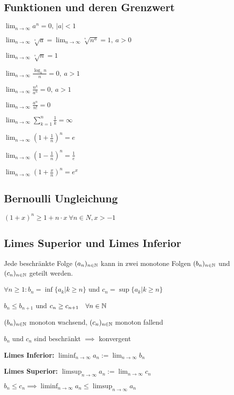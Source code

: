 \subsection{Funktionen und deren Grenzwert}
\begin{compactitem}
    \item $\lim_{n \to \infty} a^n = 0, \ |a| < 1$
    \item $\lim_{n \to \infty} \sqrt[^n]{a} = \lim_{n \to \infty} \sqrt[^n]{n^a} = 1, \ a > 0$
    \item $\lim_{n \to \infty} \sqrt[^n]{n} = 1$
    \item $\lim_{n \to \infty} \frac{\log_an}{n} = 0, \ a > 1$
    \item $\lim_{n \to \infty} \frac{n^k}{a^n} = 0, \ a > 1$
    \item $\lim_{n \to \infty} \frac{a^n}{n!} = 0$
    \item $\lim_{n \to \infty} \sum_{k=1}^{n} \frac{1}{k} = \infty$
    \item $\lim_{n \to \infty} \left( 1 + \frac{1}{n} \right)^n = e$
    \item $\lim_{n \to \infty} \left( 1 - \frac{1}{n} \right)^n = \frac{1}{e}$
    \item $\lim_{n \to \infty} \left( 1 + \frac{x}{n} \right)^n =e^x$
\end{compactitem}

\subsection{Bernoulli Ungleichung}
$\left( 1 + x \right)^{n} \ge  1 + n \cdot x \ \forall n \in N, x > -1 $

\subsection{Limes Superior und Limes Inferior}
Jede beschränkte Folge $(a_n)_{n \in \mathbb{N}}$ kann in zwei monotone Folgen $(b_n)_{n \in \mathbb{N}}$ und $(c_n)_{n \in \mathbb{N}}$ geteilt werden.
\begin{compactenum}
    \item $\forall n \ge 1: b_n = \inf \{a_k | k \ge n\}$ und $c_n = \sup \{a_k | k \ge n\} $
    \item $b_n \le b_{n+1}$ und $c_n \ge c_{n+1} \quad \forall n \in \mathbb{N}$
    \item $(b_n)_{n \in \mathbb{N}}$ monoton wachsend, $(c_n)_{n \in \mathbb{N}}$ monoton fallend
    \item $b_n$ und $c_n$ sind beschränkt $\implies$ konvergent
    \item \textbf{Limes Inferior:} $\liminf_{n \to \infty} a_n := \lim_{n \to \infty} b_n $
    \item \textbf{Limes Superior:} $\limsup_{n \to \infty} a_n := \lim_{n \to \infty} c_n $
    \item $b_n \le  c_n \implies \liminf_{n \to \infty} a_n \le  \limsup_{n \to \infty} a_n $
\end{compactenum}

